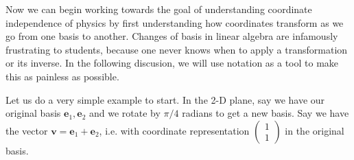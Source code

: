 \documentclass[../master.tex]{subfiles}
\begin{document}
	Now we can begin working towards the goal of understanding coordinate independence of physics by first understanding how coordinates transform as we go from one basis to another. Changes of basis in linear algebra are infamously frustrating to students, because one never knows when to apply a transformation or its inverse. In the following discusion, we will use notation as a tool to make this as painless as possible. 
	
	Let us do a very simple example to start. In the 2-D plane, say we have our original basis $\mathbf e_1, \mathbf e_2$ and we rotate by $\pi/4$ radians to get a new basis. Say we have the vector $\mathbf v = \mathbf e_1 + \mathbf e_2$, i.e. with coordinate representation $\begin{pmatrix} 1 \\ 1 \end{pmatrix}$ in the original basis.
	
\end{document}
